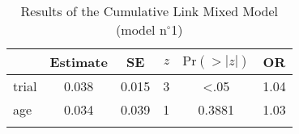 \begin{table}
\begin{tabular}{l S[table-format=1.3] S[table-format=1.3] c S[table-format=<1.4] S[table-format=1.2]}
\lsptoprule
 & {Estimate} & {SE} & {$z$} & {$\text{Pr}(>|z|)$} & {OR} \\ 
\midrule
  trial & 0.038 & 0.015 & 3 & <.05 & 1.04 \\ 
  age   & 0.034 & 0.039 & 1 & 0.3881 & 1.03 \\ 
 \lspbottomrule
\end{tabular}
\caption{Results of the Cumulative Link Mixed Model (model n$^{\circ}$1)}
\label{tab:exp11-m1}
\end{table}
